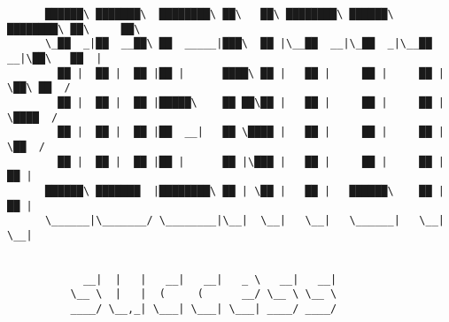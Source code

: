 \documentclass[varwidth=\maxdimen,margin=0.5cm,multi={verbatim}]{standalone}
\begin{document}
\begin{verbatim}
      ██████\ ███████\  ████████\ ██\   ██\ ████████\ ██████\ ████████\ ██\     ██\
      \_██  _|██  __██\ ██  _____|███\  ██ |\__██  __|\_██  _|\__██  __|\██\   ██  |
        ██ |  ██ |  ██ |██ |      ████\ ██ |   ██ |     ██ |     ██ |    \██\ ██  /
        ██ |  ██ |  ██ |█████\    ██ ██\██ |   ██ |     ██ |     ██ |     \████  /
        ██ |  ██ |  ██ |██  __|   ██ \████ |   ██ |     ██ |     ██ |      \██  /
        ██ |  ██ |  ██ |██ |      ██ |\███ |   ██ |     ██ |     ██ |       ██ |
      ██████\ ███████  |████████\ ██ | \██ |   ██ |   ██████\    ██ |       ██ |
      \______|\_______/ \________|\__|  \__|   \__|   \______|   \__|       \__|


            __|  |   |   __|   __|   _ \   __|   __|
          \__ \  |   |  (     (      __/ \__ \ \__ \
          ____/ \__,_| \___| \___| \___| ____/ ____/




\end{verbatim}
\end{document}
